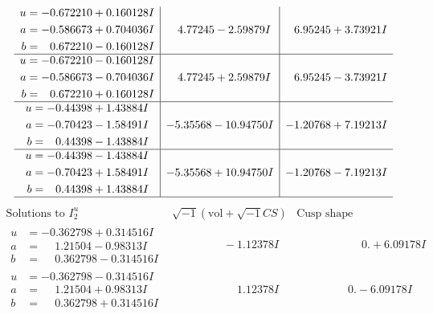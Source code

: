 \documentclass[1p]{elsarticle_modified}
\theoremstyle{definition}
\newcommand{\I}{\sqrt{-1}}
\begin{document}
$$\begin{array}{c|c|c}
\begin{aligned}
u &= -0.672210 + 0.160128 I \\
a &= -0.586673 + 0.704036 I \\
b &= \phantom{-}0.672210 - 0.160128 I\end{aligned}
 & \phantom{-}4.77245 - 2.59879 I & \phantom{-}6.95245 + 3.73921 I \\ \hline\begin{aligned}
u &= -0.672210 - 0.160128 I \\
a &= -0.586673 - 0.704036 I \\
b &= \phantom{-}0.672210 + 0.160128 I\end{aligned}
 & \phantom{-}4.77245 + 2.59879 I & \phantom{-}6.95245 - 3.73921 I \\ \hline\begin{aligned}
u &= -0.44398 + 1.43884 I \\
a &= -0.70423 - 1.58491 I \\
b &= \phantom{-}0.44398 - 1.43884 I\end{aligned}
 & -5.35568 - 10.94750 I & -1.20768 + 7.19213 I \\ \hline\begin{aligned}
u &= -0.44398 - 1.43884 I \\
a &= -0.70423 + 1.58491 I \\
b &= \phantom{-}0.44398 + 1.43884 I\end{aligned}
 & -5.35568 + 10.94750 I & -1.20768 - 7.19213 I\\
 \hline 
 \end{array}$$\newpage$$\begin{array}{c|c|c}  
\text{Solutions to }I^u_{2}& \I (\text{vol} + \sqrt{-1}CS) & \text{Cusp shape}\\
 \hline 
\begin{aligned}
u &= -0.362798 + 0.314516 I \\
a &= \phantom{-}1.21504 - 0.98313 I \\
b &= \phantom{-}0.362798 - 0.314516 I\end{aligned}
 & \phantom{-0.000000 } -1.12378 I & \phantom{-0.000000 -}0. + 6.09178 I \\ \hline\begin{aligned}
u &= -0.362798 - 0.314516 I \\
a &= \phantom{-}1.21504 + 0.98313 I \\
b &= \phantom{-}0.362798 + 0.314516 I\end{aligned}
 & \phantom{-0.000000 -}1.12378 I & \phantom{-0.000000 } 0. - 6.09178 I \\ \hline\begin{aligned}

\end{aligned}
\end{array}$$
\end{document}
